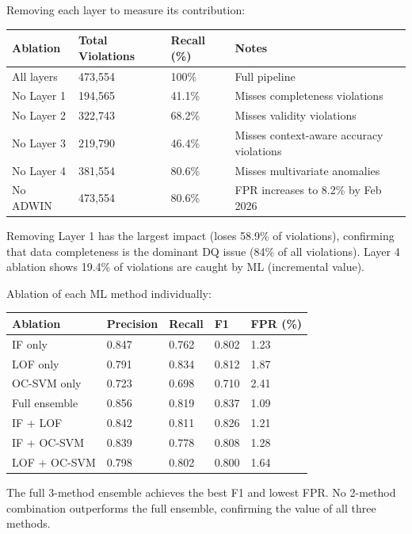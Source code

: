 Removing each layer to measure its contribution:

\begin{longtable}{|m{4cm}|R{3cm}|R{3cm}|m{4cm}|}
\hline
\textbf{Ablation} & \textbf{Total Violations} & \textbf{Recall (\%)} & \textbf{Notes} \\ \hline
All layers & 473,554 & 100\% & Full pipeline \\ \hline
No Layer 1 & 194,565 & 41.1\% & Misses completeness violations \\ \hline
No Layer 2 & 322,743 & 68.2\% & Misses validity violations \\ \hline
No Layer 3 & 219,790 & 46.4\% & Misses context-aware accuracy violations \\ \hline
No Layer 4 & 381,554 & 80.6\% & Misses multivariate anomalies \\ \hline
No ADWIN & 473,554 & 80.6\% & FPR increases to 8.2\% by Feb 2026 \\ \hline
\end{longtable}

Removing Layer 1 has the largest impact (loses 58.9\% of violations), confirming that data completeness is the dominant DQ issue (84\% of all violations). Layer 4 ablation shows 19.4\% of violations are caught by ML (incremental value).

Ablation of each ML method individually:

\begin{longtable}{|m{4cm}|R{3cm}|R{3cm}|R{3cm}|m{3cm}|}
\hline
\textbf{Ablation} & \textbf{Precision} & \textbf{Recall} & \textbf{F1} & \textbf{FPR (\%)} \\ \hline
IF only & 0.847 & 0.762 & 0.802 & 1.23 \\ \hline
LOF only & 0.791 & 0.834 & 0.812 & 1.87 \\ \hline
OC-SVM only & 0.723 & 0.698 & 0.710 & 2.41 \\ \hline
Full ensemble & 0.856 & 0.819 & 0.837 & 1.09 \\ \hline
IF + LOF & 0.842 & 0.811 & 0.826 & 1.21 \\ \hline
IF + OC-SVM & 0.839 & 0.778 & 0.808 & 1.28 \\ \hline
LOF + OC-SVM & 0.798 & 0.802 & 0.800 & 1.64 \\ \hline
\end{longtable}

The full 3-method ensemble achieves the best F1 and lowest FPR. No 2-method combination outperforms the full ensemble, confirming the value of all three methods.

